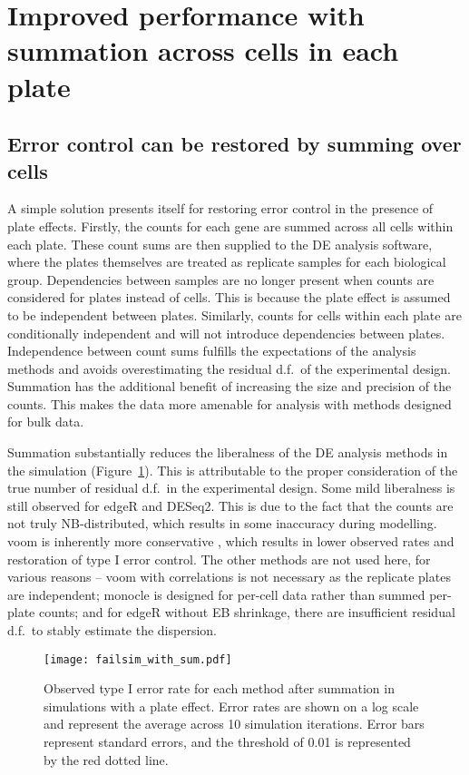 \documentclass{article}
\begin{document}
\section{Improved performance with summation across cells in each plate}

\subsection{Error control can be restored by summing over cells}
A simple solution presents itself for restoring error control in the presence of plate effects.
Firstly, the counts for each gene are summed across all cells within each plate.
These count sums are then supplied to the DE analysis software, where the plates themselves are treated as replicate samples for each biological group.
Dependencies between samples are no longer present when counts are considered for plates instead of cells.
This is because the plate effect is assumed to be independent between plates. 
Similarly, counts for cells within each plate are conditionally independent and will not introduce dependencies between plates.
Independence between count sums fulfills the expectations of the analysis methods and avoids overestimating the residual d.f.\ of the experimental design.
Summation has the additional benefit of increasing the size and precision of the counts.
This makes the data more amenable for analysis with methods designed for bulk data.

Summation substantially reduces the liberalness of the DE analysis methods in the simulation (Figure~\ref{fig:platesum}).
This is attributable to the proper consideration of the true number of residual d.f.\ in the experimental design.
Some mild liberalness is still observed for edgeR and DESeq2.
This is due to the fact that the counts are not truly NB-distributed, which results in some inaccuracy during modelling.
voom is inherently more conservative \cite{law2014voom}, which results in lower observed rates and restoration of type I error control.
The other methods are not used here, for various reasons -- voom with correlations is not necessary as the replicate plates are independent;
    monocle is designed for per-cell data rather than summed per-plate counts;
    and for edgeR without EB shrinkage, there are insufficient residual d.f.\ to stably estimate the dispersion.

\begin{figure}[tbp]
\begin{center}
\texttt{[image: failsim\_with\_sum.pdf]}
\end{center}
\caption{
    Observed type I error rate for each method after summation in simulations with a plate effect.
    Error rates are shown on a log scale and represent the average across 10 simulation iterations.
    Error bars represent standard errors, and the threshold of 0.01 is represented by the red dotted line.
}
\label{fig:platesum}
\end{figure}
\end{document}

